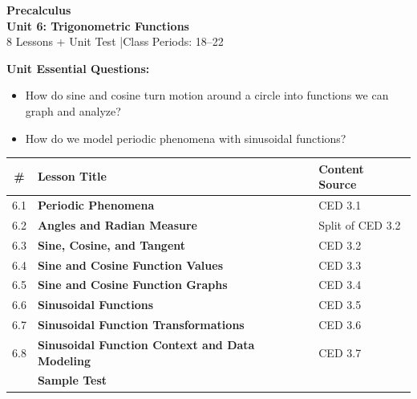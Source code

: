 \documentclass[10pt]{article}
\begin{document}
\thispagestyle{empty}

\vspace{-1.05in}

\begin{center}
  {\color{white}\textbf{\LARGE Precalculus}}\\[6pt]
  {\color{skymid}\Large\textbf{Unit 6: Trigonometric Functions}}\\[4pt]
  {\color{white}\small 8 Lessons + Unit Test \quad|\quad Class Periods: 18--22}
\end{center}

\vspace{0.26in}

\begin{tcolorbox}[colback=goldbg, colframe=goldacc, boxrule=0.8pt, arc=2mm,
    left=3mm, right=3mm, top=2mm, bottom=2mm]
\small\textbf{Unit Essential Questions:}
\begin{itemize}[leftmargin=1.4em, itemsep=2pt, topsep=2pt]
  \item How do sine and cosine turn motion around a circle into functions we can graph and analyze?
  \item How do we model periodic phenomena with sinusoidal functions?
\end{itemize}
\end{tcolorbox}

\vspace{0.14in}

\begin{tocbox}
\small
\renewcommand{\arraystretch}{1.45}
\begin{tabularx}{\linewidth}{@{} c >{\bfseries}X l @{}}
\rowcolor{sky}
\textbf{\#} & \textbf{Lesson Title} & \textbf{Content Source} \\
\midrule
6.1 & Periodic Phenomena & CED 3.1 \\
6.2 & Angles and Radian Measure & Split of CED 3.2 \\
6.3 & Sine, Cosine, and Tangent & CED 3.2 \\
6.4 & Sine and Cosine Function Values & CED 3.3 \\
6.5 & Sine and Cosine Function Graphs & CED 3.4 \\
6.6 & Sinusoidal Functions & CED 3.5 \\
6.7 & Sinusoidal Function Transformations & CED 3.6 \\
6.8 & Sinusoidal Function Context and Data Modeling & CED 3.7 \\
\midrule
\rowcolor{sky}
     & \textbf{Sample Test} &      \\
\end{tabularx}
\end{tocbox}
\end{document}
